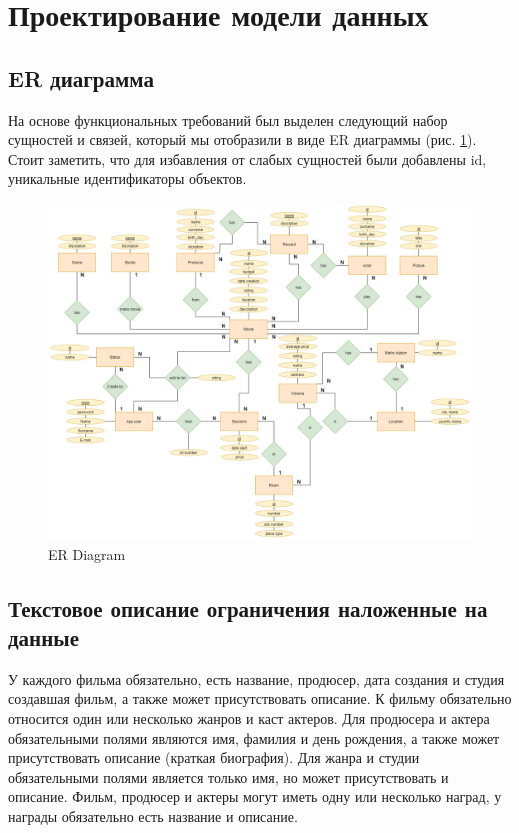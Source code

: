\documentclass[a4paper,16pt]{article}
\begin{document}
\section{Проектирование модели данных}
\subsection{ER диаграмма}
На основе функциональных требований был выделен следующий набор сущностей и связей, который мы отобразили в виде ER диаграммы (рис. \ref{fig:ER}). Стоит заметить, что для избавления от слабых сущностей были добавлены id, уникальные идентификаторы объектов.
\begin{figure}[h]
    \centering
    \includegraphics[scale=0.28]{thisMoview.png}
    \caption{ER Diagram}
    \label{fig:ER}
\end{figure}
\subsection{Текстовое описание ограничения наложенные на данные}
У каждого фильма обязательно, есть название, продюсер, дата создания и студия создавшая фильм, а также может присутствовать описание. К фильму обязательно относится один или несколько жанров и каст актеров. Для продюсера и актера обязательными полями являются имя, фамилия и день рождения, а также может присутствовать описание (краткая биография). Для жанра и студии обязательными полями является только имя, но может присутствовать и описание. Фильм, продюсер и актеры могут иметь одну или несколько наград, у награды обязательно есть название и описание.
\end{document}
